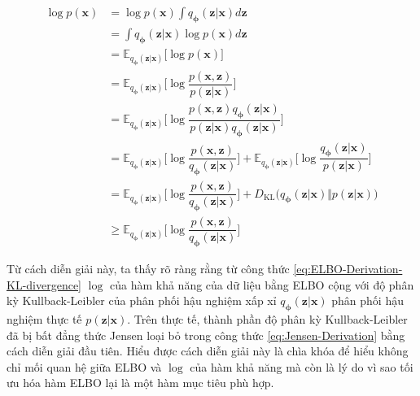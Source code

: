 \documentclass[14pt, a4paper]{article}
\numberwithin{equation}{section}
\numberwithin{figure}{section}
\numberwithin{dl}{section}
\numberwithin{md}{section}
\numberwithin{bd}{section}
\numberwithin{dn}{section}
\numberwithin{hq}{section}
\begin{document}
    \begin{equation} \label{eq:ELBO-Derivation-KL-divergence}
        \begin{aligned}
            \log p(\boldsymbol{x}) &= \log p(\boldsymbol{x}) \int q_{\boldsymbol{\phi}} (\boldsymbol{z} \vert \boldsymbol{x}) d \boldsymbol{z} \\
            &= \int q_{\boldsymbol{\phi}} (\boldsymbol{z} \vert \boldsymbol{x}) \log p (\boldsymbol{x}) d \boldsymbol{z} \\
            &= \mathbb{E}_{q_{\boldsymbol{\phi}} (\boldsymbol{z} \vert \boldsymbol{x})} \lbrack \log p (\boldsymbol{x}) \rbrack \\
            &= \mathbb{E}_{q_{\boldsymbol{\phi}} (\boldsymbol{z} \vert \boldsymbol{x})} \Bigg \lbrack \log \dfrac{p(\boldsymbol{x}, \boldsymbol{z})}{p(\boldsymbol{z} \vert \boldsymbol{x})} \Bigg \rbrack \\
            &= \mathbb{E}_{q_{\boldsymbol{\phi}} (\boldsymbol{z} \vert \boldsymbol{x})} \Bigg \lbrack \log \dfrac{p(\boldsymbol{x}, \boldsymbol{z}) q_{\boldsymbol{\phi}} (\boldsymbol{z} \vert \boldsymbol{x})}{p(\boldsymbol{z} \vert \boldsymbol{x}) q_{\boldsymbol{\phi}} (\boldsymbol{z} \vert \boldsymbol{x})} \Bigg \rbrack \\
            &= \mathbb{E}_{q_{\boldsymbol{\phi}} (\boldsymbol{z} \vert \boldsymbol{x})} \Bigg \lbrack \log \dfrac{p(\boldsymbol{x}, \boldsymbol{z})}{q_{\boldsymbol{\phi}} (\boldsymbol{z} \vert \boldsymbol{x})} \Bigg \rbrack + \mathbb{E}_{q_{\boldsymbol{\phi}} (\boldsymbol{z} \vert \boldsymbol{x})} \Bigg \lbrack \log \dfrac{q_{\boldsymbol{\phi}} (\boldsymbol{z} \vert \boldsymbol{x})}{p(\boldsymbol{z} \vert \boldsymbol{x})} \Bigg \rbrack \\
            &= \mathbb{E}_{q_{\boldsymbol{\phi}} (\boldsymbol{z} \vert \boldsymbol{x})} \Bigg \lbrack \log \dfrac{p(\boldsymbol{x}, \boldsymbol{z})}{q_{\boldsymbol{\phi}} (\boldsymbol{z} \vert \boldsymbol{x})} \Bigg \rbrack + D_{\mathrm{KL}} \big( q_{\boldsymbol{\phi}} (\boldsymbol{z} \vert \boldsymbol{x}) \Vert p(\boldsymbol{z} \vert \boldsymbol{x}) \big) \\
            &\geq \mathbb{E}_{q_{\boldsymbol{\phi}} (\boldsymbol{z} \vert \boldsymbol{x})} \Bigg \lbrack \log \dfrac{p(\boldsymbol{x}, \boldsymbol{z})}{q_{\boldsymbol{\phi}} (\boldsymbol{z} \vert \boldsymbol{x})} \Bigg \rbrack
        \end{aligned}
    \end{equation}

    Từ cách diễn giải này, ta thấy rõ ràng rằng từ công thức \ref{eq:ELBO-Derivation-KL-divergence} $\log$ của hàm khả năng của dữ liệu bằng ELBO cộng với độ phân kỳ Kullback-Leibler của phân phối hậu nghiệm xấp xỉ $q_{\boldsymbol{\phi}} (\boldsymbol{z} \vert \boldsymbol{x})$ phân phối hậu nghiệm thực tế $p(\boldsymbol{z} \vert \boldsymbol{x})$.
    Trên thực tế, thành phần độ phân kỳ Kullback-Leibler đã bị bất đẳng thức Jensen loại bỏ trong công thức \ref{eq:Jensen-Derivation} bằng cách diễn giải đầu tiên.
    Hiểu được cách diễn giải này là chìa khóa để hiểu không chỉ mối quan hệ giữa ELBO và $\log$ của hàm khả năng mà còn là lý do vì sao tối ưu hóa hàm ELBO lại là một hàm mục tiêu phù hợp.
\end{document}
